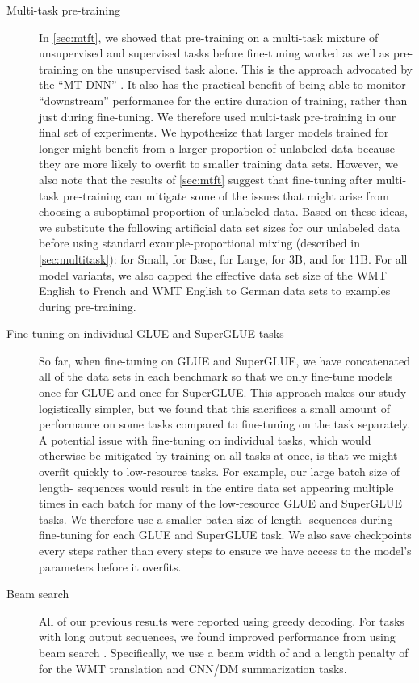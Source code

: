 \documentclass[twoside,11pt]{article}
\begin{document}
\begin{description}
\item[Multi-task pre-training] In \cref{sec:mtft}, we showed that pre-training on a multi-task mixture of unsupervised and supervised tasks before fine-tuning worked as well as pre-training on the unsupervised task alone.
This is the approach advocated by the ``MT-DNN'' \citep{liu2015representation,liu2019multi}.
It also has the practical benefit of being able to monitor ``downstream'' performance for the entire duration of training, rather than just during fine-tuning.
We therefore used multi-task pre-training in our final set of experiments.
We hypothesize that larger models trained for longer might benefit from a larger proportion of unlabeled data because they are more likely to overfit to smaller training data sets.
However, we also note that the results of \cref{sec:mtft} suggest that fine-tuning after multi-task pre-training can mitigate some of the issues that might arise from choosing a suboptimal proportion of unlabeled data.
Based on these ideas, we substitute the following artificial data set sizes for our unlabeled data before using standard example-proportional mixing (described in \cref{sec:multitask}):  for Small,  for Base,  for Large,  for 3B, and  for 11B.
For all model variants, we also capped the effective data set size of the WMT English to French and WMT English to German data sets to  examples during pre-training.

\item[Fine-tuning on individual GLUE and SuperGLUE tasks] So far, when fine-tuning on GLUE and SuperGLUE, we have concatenated all of the data sets in each benchmark so that we only fine-tune models once for GLUE and once for SuperGLUE.
This approach makes our study logistically simpler, but we found that this sacrifices a small amount of performance on some tasks compared to fine-tuning on the task separately.
A potential issue with fine-tuning on individual tasks, which would otherwise be mitigated by training on all tasks at once, is that we might overfit quickly to low-resource tasks.
For example, our large batch size of  length- sequences would result in the entire data set appearing multiple times in each batch for many of the low-resource GLUE and SuperGLUE tasks.
We therefore use a smaller batch size of  length- sequences during fine-tuning for each GLUE and SuperGLUE task.
We also save checkpoints every  steps rather than every  steps to ensure we have access to the model's parameters before it overfits.

\item[Beam search] All of our previous results were reported using greedy decoding.
For tasks with long output sequences, we found improved performance from using beam search \citep{sutskever2014sequence}.
Specifically, we use a beam width of  and a length penalty of  \citep{wu2016google} for the WMT translation and CNN/DM summarization tasks.


\end{description}
\end{document}
